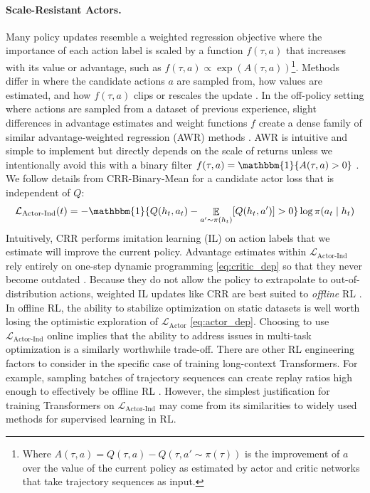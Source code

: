 \documentclass{article}
\begin{document}
\paragraph{Scale-Resistant Actors.} Many policy updates resemble a weighted regression objective where the importance of each action label is scaled by a function $f(\tau, a)$ that increases with its value or advantage, such as $f(\tau, a) \propto \exp(A(\tau, a))$\footnote{Where $A(\tau, a) = Q(\tau, a) - Q(\tau, a' \sim \pi(\tau))$ is the improvement of $a$ over the value of the current policy as estimated by actor and critic networks that take trajectory sequences as input.}. Methods differ in where the candidate actions $a$ are sampled from, how values are estimated, and how $f(\tau, a)$ clips or rescales the update \cite{hessel2021muesli, schulman2017proximal, abdolmaleki2018maximum, peng2019advantage, wang2018exponentially}. In the off-policy setting where actions are sampled from a dataset of previous experience, slight differences in advantage estimates and weight functions $f$ create a dense family of similar advantage-weighted regression (AWR) methods \cite{peng2019advantage, wang2018exponentially, chen2020bail, siegel2020keep, grigsby2021closer}. AWR is intuitive and simple to implement but directly depends on the scale of returns unless we intentionally avoid this with a binary filter $f(\tau, a) = \mathbbm{1}\{A(\tau, a) > 0\}$ \cite{wang2020critic, nair2018overcoming}. We follow details from CRR-Binary-Mean \cite{wang2020critic} for a candidate actor loss that is independent of $Q$:
\vspace{-4mm}
\begin{align}
    \label{eq:actor_ind}
    \mathcal{L}_{\text{Actor-Ind}}(t) = -\mathbbm{1}\{Q(h_t, a_t) - \mathop{\mathbb{E}}_{a' \sim \pi(h_t)}[Q(h_t, a')] > 0\}\log\pi(a_t \mid h_t)
\end{align}
\vspace{-4mm}
Intuitively, CRR performs imitation learning (IL) on action labels that we estimate will improve the current policy. Advantage estimates within $\mathcal{L}_{\text{Actor-Ind}}$ rely entirely on one-step dynamic programming \eqref{eq:critic_dep} so that they never become outdated \cite{wang2020critic, nair2020awac}. Because they do not allow the policy to extrapolate to out-of-distribution actions, weighted IL updates like CRR are best suited to \textit{offline} RL \cite{levine2020offline}. In offline RL, the ability to stabilize optimization on static datasets is well worth losing the optimistic exploration of $\mathcal{L}_{\text{Actor}}$ \eqref{eq:actor_dep}. Choosing to use $\mathcal{L}_{\text{Actor-Ind}}$ online implies that the ability to address issues in multi-task optimization is a similarly worthwhile trade-off. There are other RL engineering factors to consider in the specific case of training long-context Transformers. For example, sampling batches of trajectory sequences can create replay ratios high enough to effectively be offline RL \cite{fedus2020revisiting}. However, the simplest justification for training Transformers on $\mathcal{L}_{\text{Actor-Ind}}$ may come from its similarities to widely used methods for supervised learning in RL.
\end{document}
